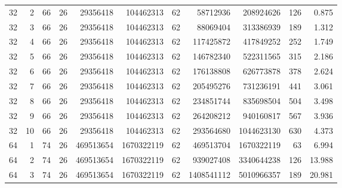 \begin{table}[t]
\begin{tabularx}{\linewidth}{rrrrrrrrrrr}
32 & 2 & 66 & 26 & 29356418 & 104462313 & 62 & 58712936 & 208924626 & 126 & 0.875 \\
32 & 3 & 66 & 26 & 29356418 & 104462313 & 62 & 88069404 & 313386939 & 189 & 1.312 \\
32 & 4 & 66 & 26 & 29356418 & 104462313 & 62 & 117425872 & 417849252 & 252 & 1.749 \\
32 & 5 & 66 & 26 & 29356418 & 104462313 & 62 & 146782340 & 522311565 & 315 & 2.186 \\
32 & 6 & 66 & 26 & 29356418 & 104462313 & 62 & 176138808 & 626773878 & 378 & 2.624 \\
32 & 7 & 66 & 26 & 29356418 & 104462313 & 62 & 205495276 & 731236191 & 441 & 3.061 \\
32 & 8 & 66 & 26 & 29356418 & 104462313 & 62 & 234851744 & 835698504 & 504 & 3.498 \\
32 & 9 & 66 & 26 & 29356418 & 104462313 & 62 & 264208212 & 940160817 & 567 & 3.936 \\
32 & 10 & 66 & 26 & 29356418 & 104462313 & 62 & 293564680 & 1044623130 & 630 & 4.373 \\
64 & 1 & 74 & 26 & 469513654 & 1670322119 & 62 & 469513704 & 1670322119 & 63 & 6.994 \\
64 & 2 & 74 & 26 & 469513654 & 1670322119 & 62 & 939027408 & 3340644238 & 126 & 13.988 \\
64 & 3 & 74 & 26 & 469513654 & 1670322119 & 62 & 1408541112 & 5010966357 & 189 & 20.981 \\
\bottomrule
\end{tabularx}
\end{table}
